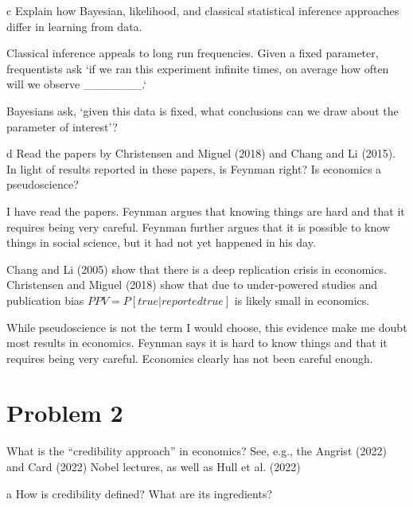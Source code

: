 \documentclass{article}
\begin{document}
\begin{problem}{c}
Explain how Bayesian, likelihood, and classical statistical inference approaches differ in learning from data.
\end{problem}

\begin{solution}

Classical inference appeals to long run frequencies. Given a fixed parameter, frequentists ask `if we ran this experiment infinite times, on average how often will we observe _______.`

Bayesians ask, `given this data is fixed, what conclusions can we draw about the parameter of interest'?

\end{solution}

\begin{problem}{d}
 Read the papers by Christensen and Miguel (2018) and Chang and Li (2015). In light of results reported in these papers, is Feynman right? Is economics a pseudoscience?
\end{problem}

\begin{solution}
I have read the papers. Feynman argues that knowing things are hard and that it requires being very careful. Feynman further argues that it is possible to know things in social science, but it had not yet happened in his day. 

Chang and Li (2005) show that there is a deep replication crisis in economics. Christensen and Miguel (2018) show that due to under-powered studies and publication bias $PPV=P[true|reported true]$ is likely small in economics. 

While pseudoscience is not the term I would choose, this evidence make me doubt most results in economics. Feynman says it is hard to know things and that it requires being very careful. Economics clearly has not been careful enough. 

\end{solution}


\newpage
\section*{Problem 2}
What is the “credibility approach” in economics? See, e.g., the Angrist
(2022) and Card (2022) Nobel lectures, as well as Hull et al. (2022)
\begin{problem}{a}
How is credibility defined? What are its ingredients?
\end{problem}
\end{document}
